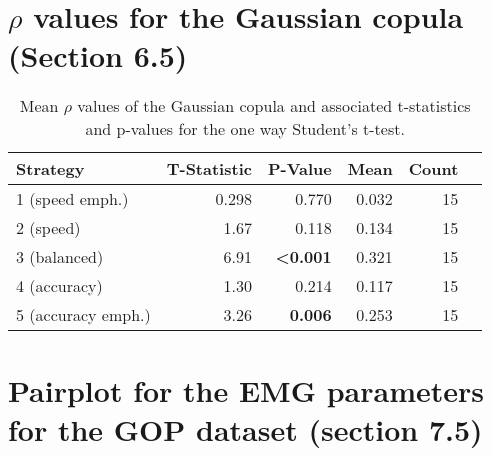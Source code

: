 \documentclass{article}
\begin{document}

\section{$\rho$ values for the Gaussian copula (Section 6.5)}
\begin{table}[htbp]
	\centering
	\caption{Mean $\rho$ values of the Gaussian copula and associated t-statistics and p-values for the one way Student's t-test.}
	\begin{tabular}{lrrrrr}
		\toprule
		  Strategy & T-Statistic & P-Value & Mean & Count \\
		\midrule
		 1 (speed emph.) & 0.298 & 0.770 & 0.032 & 15 \\
		 2 (speed)& 1.67 & 0.118 & 0.134 & 15 \\
		 3 (balanced)& 6.91 & \textbf{\textless 0.001} & 0.321 & 15 \\
		 4 (accuracy) & 1.30 & 0.214 & 0.117 & 15 \\
		 5 (accuracy emph.)& 3.26 & \textbf{0.006} & 0.253 & 15 \\
		\bottomrule
		\end{tabular}
	\label{tab:gauss_corr}
\end{table}

\section{Pairplot for the EMG parameters for the GOP dataset (section 7.5)}
\end{document}
